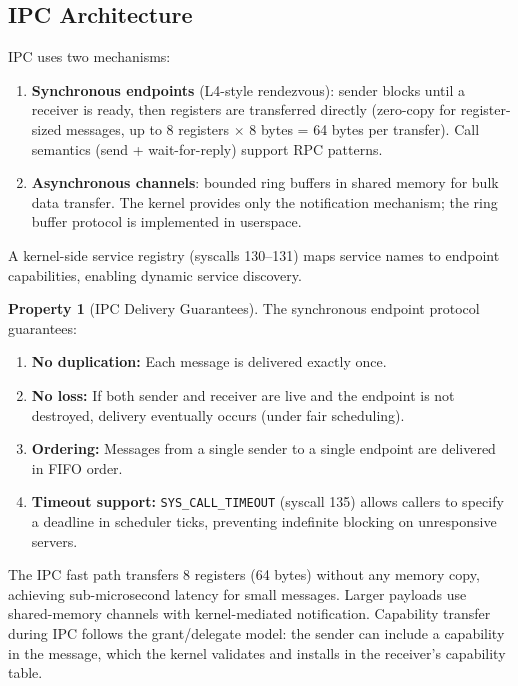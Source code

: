 \documentclass[11pt,a4paper]{article}
\theoremstyle{definition}
\newtheorem{property}{Property}[section]
\theoremstyle{remark}
\begin{document}
\subsection{IPC Architecture}
\label{sec:arch-ipc}

IPC uses two mechanisms:

\begin{enumerate}
\item \textbf{Synchronous endpoints} (L4-style rendezvous): sender
  blocks until a receiver is ready, then registers are transferred
  directly (zero-copy for register-sized messages, up to 8 registers
  $\times$ 8 bytes = 64 bytes per transfer). Call semantics
  (send + wait-for-reply) support RPC patterns.

\item \textbf{Asynchronous channels}: bounded ring buffers in shared
  memory for bulk data transfer. The kernel provides only the
  notification mechanism; the ring buffer protocol is implemented in
  userspace.
\end{enumerate}

A kernel-side service registry (syscalls 130--131) maps service names
to endpoint capabilities, enabling dynamic service discovery.

\begin{property}[IPC Delivery Guarantees]
\label{prop:ipc}
The synchronous endpoint protocol guarantees:
\begin{enumerate}[label=(\roman*)]
\item \textbf{No duplication:} Each message is delivered exactly once.
\item \textbf{No loss:} If both sender and receiver are live and the
  endpoint is not destroyed, delivery eventually occurs (under fair
  scheduling).
\item \textbf{Ordering:} Messages from a single sender to a single
  endpoint are delivered in FIFO order.
\item \textbf{Timeout support:} \texttt{SYS\_CALL\_TIMEOUT} (syscall
  135) allows callers to specify a deadline in scheduler ticks,
  preventing indefinite blocking on unresponsive servers.
\end{enumerate}
\end{property}

The IPC fast path transfers 8 registers (64 bytes) without any memory
copy, achieving sub-microsecond latency for small messages. Larger
payloads use shared-memory channels with kernel-mediated notification.
Capability transfer during IPC follows the grant/delegate model:
the sender can include a capability in the message, which the kernel
validates and installs in the receiver's capability table.
\end{document}
